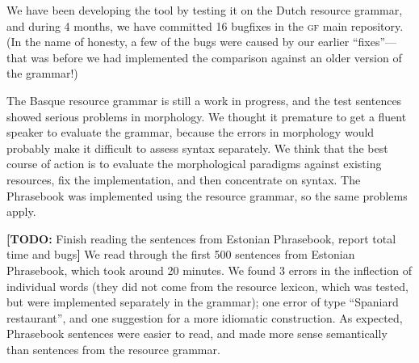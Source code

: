 \documentclass[11pt]{article}
\def\gf{\textsc{gf}}
\newcommand{\todo}[1]{{\color{cyan}\textbf{[TODO: }#1\textbf{]}}}
\begin{document}
We have been developing the tool by testing it on the Dutch resource
grammar, and during 4 months, we have committed 16 bugfixes in the
\gf{} main repository. (In the name of honesty, a few of the bugs were
caused by our earlier ``fixes''---that was before we had implemented
the comparison against an older version of the grammar!) 

The Basque resource grammar is still a work in progress, and the
test sentences showed serious problems in morphology.
We thought it premature to get a fluent speaker to evaluate the grammar,
because the errors in morphology would probably make it
difficult to assess syntax separately. We think that the best course
of action is to evaluate the morphological paradigms against existing
resources, fix the implementation, and then concentrate on syntax.
The Phrasebook was implemented using the resource grammar, so the
same problems apply.

\todo{Finish reading the sentences from Estonian Phrasebook, report
  total time and bugs}
We read through the first 500 sentences from Estonian Phrasebook,
which took around 20 minutes. We found 3 errors in the inflection of
individual words (they did not come from the resource lexicon, which
was tested, but were implemented separately in the grammar); one error
of type ``Spaniard restaurant'', and one suggestion for a more idiomatic
construction. As expected, Phrasebook sentences were easier to read,
and made more sense semantically than sentences from the resource
grammar.






\end{document}
